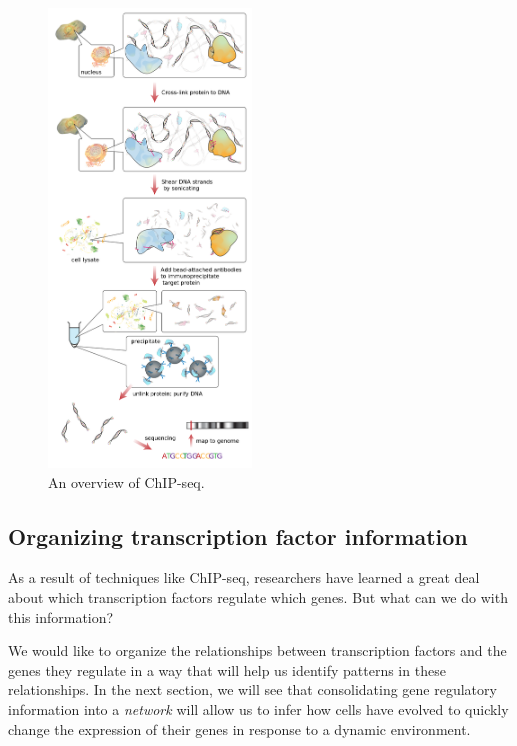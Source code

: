 \begin{figure}[h]
\centering
\mySfFamily
\includegraphics[width = 0.48\textwidth]{../images/ChIP-seq_workflow.png}
\caption{An overview of ChIP-seq.}
\label{fig:ChIP-seq_workflow}
\end{figure}

\begin{qbox}\end{qbox}


\subsection{Organizing transcription factor information}

As a result of techniques like ChIP-seq, researchers have learned a great deal about which transcription factors regulate which genes. But what can we do with this information?

We would like to organize the relationships between transcription factors and the genes they regulate in a way that will help us identify patterns in these relationships. In the next section, we will see that consolidating gene regulatory information into a \textit{network} will allow us to infer how cells have evolved to quickly change the expression of their genes in response to a dynamic environment.\\


